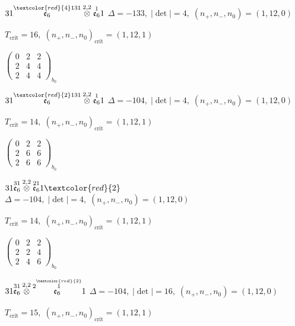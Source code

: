 \documentclass[10pt]{article}
\begin{document}
$31\overset{\textcolor{red}{4}131}{\mathfrak{e}_6}\overset{2,2}{\otimes}\overset{1}{\mathfrak{e}_6}1$ \quad $\Delta=-133,\; |\det|=4,\; (n_+,n_-,n_0)=(1,12,0)$

\hspace{1em}$T_{\text{crit}}=16,\; (n_+,n_-,n_0)_{\text{crit}}=(1,12,1)$

\hspace{2em}$\left(\begin{smallmatrix}0 & 2 & 2 \\ 2 & 4 & 4 \\ 2 & 4 & 4\end{smallmatrix}\right)_{\!b_0}$

$31\overset{\textcolor{red}{2}131}{\mathfrak{e}_6}\overset{2,2}{\otimes}\overset{1}{\mathfrak{e}_6}1$ \quad $\Delta=-104,\; |\det|=4,\; (n_+,n_-,n_0)=(1,12,0)$

\hspace{1em}$T_{\text{crit}}=14,\; (n_+,n_-,n_0)_{\text{crit}}=(1,12,1)$

\hspace{2em}$\left(\begin{smallmatrix}0 & 2 & 2 \\ 2 & 6 & 6 \\ 2 & 6 & 6\end{smallmatrix}\right)_{\!b_0}$

\smallskip

$31\overset{31}{\mathfrak{e}_6}\overset{2,2}{\otimes}\overset{21}{\mathfrak{e}_6}1\textcolor{red}{2}$ \quad $\Delta=-104,\; |\det|=4,\; (n_+,n_-,n_0)=(1,12,0)$

\hspace{1em}$T_{\text{crit}}=14,\; (n_+,n_-,n_0)_{\text{crit}}=(1,12,1)$

\hspace{2em}$\left(\begin{smallmatrix}0 & 2 & 2 \\ 2 & 2 & 4 \\ 2 & 4 & 6\end{smallmatrix}\right)_{\!b_0}$

$31\overset{31}{\mathfrak{e}_6}\overset{2,2}{\otimes}\overset{2\overset{\textcolor{red}{2}}{1}}{\mathfrak{e}_6}1$ \quad $\Delta=-104,\; |\det|=16,\; (n_+,n_-,n_0)=(1,12,0)$

\hspace{1em}$T_{\text{crit}}=15,\; (n_+,n_-,n_0)_{\text{crit}}=(1,12,1)$
\end{document}
